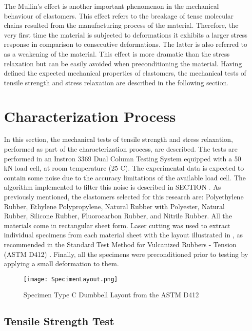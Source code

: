 The Mullin's effect is another important phenomenon in the mechanical behaviour of elastomers. This effect refers to the breakage of tense molecular chains resulted from the manufacturing process of the material. Therefore, the very first time the material is subjected to deformations it exhibits a larger stress response in comparison to consecutive deformations. The latter is also referred to as a weakening of the material. This effect is more dramatic than the stress relaxation but can be easily avoided when preconditioning the material. Having defined the expected mechanical properties of elastomers, the mechanical tests of tensile strength and stress relaxation are described in the following section.

\section{Characterization Process} \label{sec:CharacterizationProcess}

In this section, the mechanical tests of tensile strength and stress relaxation, performed as part of the characterization process, are described. The tests are performed in an Instron 3369 Dual Column Testing System equipped with a 50 kN load cell, at room temperature (25 \degree{} C). The experimental data is expected to contain some noise due to the accuracy limitations of the available load cell. The algorithm implemented to filter this noise is described in SECTION . As previously mentioned, the elastomers selected for this research are: Polyethylene Rubber, Ethylene Polypropylene, Natural Rubber with Polyester, Natural Rubber, Silicone Rubber, Fluorocarbon Rubber, and Nitrile Rubber. All the materials come in rectangular sheet form. Laser cutting was used to extract individual specimens from each material sheet with the layout illustrated in , as recommended in the Standard Test Method for Vulcanized Rubbers - Tension (ASTM D412) \cite{astmd412}. Finally, all the specimens were preconditioned prior to testing by applying a small deformation to them.

\begin{figure}[htb!]
    \centering
    \texttt{[image: SpecimenLayout.png]}
    \caption{Specimen Type C Dumbbell Layout from the ASTM D412 \cite{astmd412}}
    \label{fig:specimenLayout}
\end{figure}

\subsection{Tensile Strength Test}

